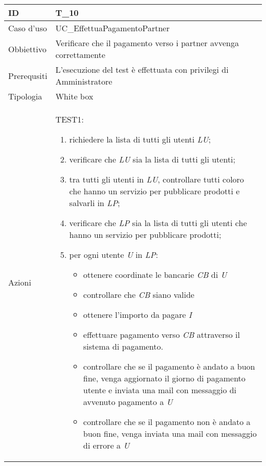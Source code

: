 \begin{table}[hb]
    \centering
    \begin{tabular}{ |p{2cm}|p{10cm}|  }
        \hline
        ID          & T\_10                                                              \\\hline
        Caso d'uso  & UC\_EffettuaPagamentoPartner                                       \\\hline
        Obbiettivo  & Verificare che il pagamento verso i partner avvenga correttamente  \\\hline
        Prerequsiti & L'esecuzione del test è effettuata con privilegi di Amministratore \\\hline
        Tipologia   & White box                                                          \\\hline
        Azioni      &
        TEST1:
        \begin{enumerate}[nosep, topsep=0pt]
            \item richiedere la lista di tutti gli utenti \emph{LU};
            \item verificare che \emph{LU} sia la lista di tutti gli utenti;
            \item tra tutti gli utenti in \emph{LU}, controllare tutti coloro che
                  hanno un servizio per pubblicare prodotti e salvarli in \emph{LP};
            \item verificare che \emph{LP} sia la lista di tutti gli utenti che
                  hanno un servizio per pubblicare prodotti;
            \item per ogni utente \emph{U} in \emph{LP}:
                  \begin{itemize}
                      \item ottenere coordinate le bancarie \emph{CB} di \emph{U}
                      \item controllare che \emph{CB} siano valide
                      \item ottenere l'importo da pagare \emph{I}
                      \item effettuare pagamento verso \emph{CB} attraverso il sistema
                            di pagamento.
                      \item controllare che se il pagamento è andato a buon fine, venga aggiornato il giorno di
                            pagamento utente e inviata una mail con messaggio di avvenuto pagamento a \emph{U}
                      \item controllare che se il pagamento non è andato a buon fine, venga inviata una mail
                            con messaggio di errore a \emph{U}
                  \end{itemize}

        \end{enumerate}
        \\\hline
    \end{tabular}
\end{table}

